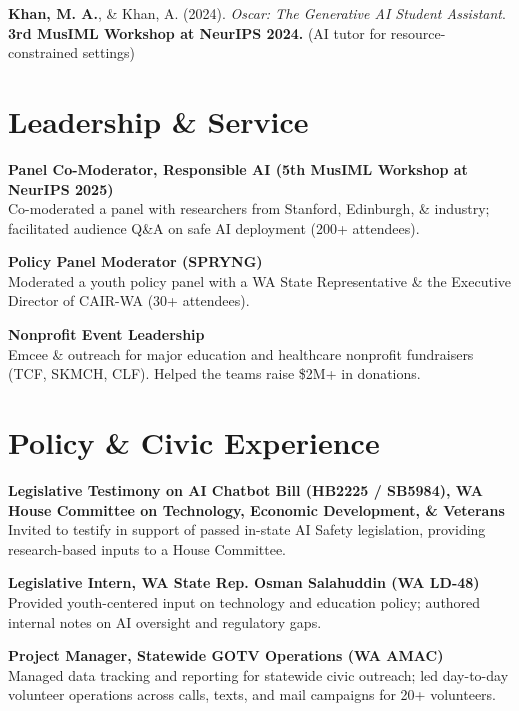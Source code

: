 \documentclass[11pt,a4paper,sans]{moderncv}
\begin{document}
\begin{minipage}[t]{0.70\textwidth}
\textbf{Khan, M. A.}, \& Khan, A. (2024). 
\textit{Oscar: The Generative AI Student Assistant}. 
\textbf{3rd MusIML Workshop at NeurIPS 2024.} (AI tutor for resource-constrained settings)


\section{Leadership \& Service}

\textbf{Panel Co-Moderator, Responsible AI (5th
MusIML Workshop at NeurIPS 2025)} \\
Co-moderated a panel with researchers from Stanford, Edinburgh, \& industry; facilitated audience Q\&A on safe AI deployment (200+ attendees).
\vspace{1mm}

\textbf{Policy Panel Moderator (SPRYNG)} \\
Moderated a youth policy panel with a WA State Representative \& the Executive Director of CAIR-WA (30+ attendees).
\vspace{1mm}

\textbf{Nonprofit Event Leadership} \\
Emcee \& outreach for major education and healthcare nonprofit fundraisers (TCF, SKMCH, CLF). Helped the teams raise \$2M+ in donations.

\section{Policy \& Civic Experience}

\textbf{Legislative Testimony on AI Chatbot Bill (HB2225 / SB5984), WA House Committee on Technology, Economic Development, \& Veterans} \\
Invited to testify in support of passed in-state AI Safety legislation, providing research-based inputs to a House Committee.
\vspace{1mm}

\textbf{Legislative Intern, WA State Rep. Osman Salahuddin (WA LD-48)} \\
Provided youth-centered input on technology and education policy; authored internal notes on AI oversight and regulatory gaps.
\vspace{1mm}

\textbf{Project Manager, Statewide GOTV Operations (WA AMAC)} \\
Managed data tracking and reporting for statewide civic outreach; led day-to-day volunteer operations across calls, texts, and mail campaigns for 20+ volunteers.
\vspace{1mm}


\end{minipage}
\end{document}
